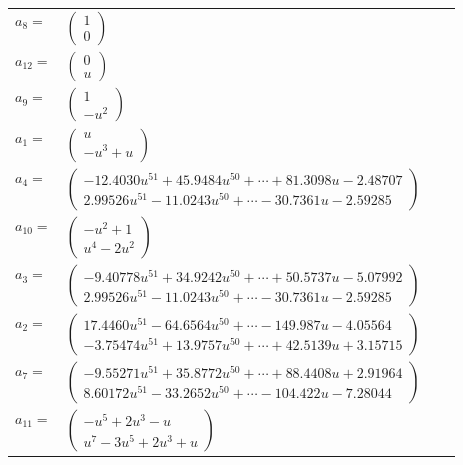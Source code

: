 \documentclass[1p]{elsarticle_modified}
\theoremstyle{definition}
\begin{document}
\begin{tabular}{m{7pt} m{180pt} m{7pt} m{180pt} }
\flushright $a_{8}=$&$\begin{pmatrix}1\\0\end{pmatrix}$ \\
\flushright $a_{12}=$&$\begin{pmatrix}0\\u\end{pmatrix}$ \\
\flushright $a_{9}=$&$\begin{pmatrix}1\\- u^2\end{pmatrix}$ \\
\flushright $a_{1}=$&$\begin{pmatrix}u\\- u^3+u\end{pmatrix}$ \\
\flushright $a_{4}=$&$\begin{pmatrix}-12.4030 u^{51}+45.9484 u^{50}+\cdots+81.3098 u-2.48707\\2.99526 u^{51}-11.0243 u^{50}+\cdots-30.7361 u-2.59285\end{pmatrix}$ \\
\flushright $a_{10}=$&$\begin{pmatrix}- u^2+1\\u^4-2 u^2\end{pmatrix}$ \\
\flushright $a_{3}=$&$\begin{pmatrix}-9.40778 u^{51}+34.9242 u^{50}+\cdots+50.5737 u-5.07992\\2.99526 u^{51}-11.0243 u^{50}+\cdots-30.7361 u-2.59285\end{pmatrix}$ \\
\flushright $a_{2}=$&$\begin{pmatrix}17.4460 u^{51}-64.6564 u^{50}+\cdots-149.987 u-4.05564\\-3.75474 u^{51}+13.9757 u^{50}+\cdots+42.5139 u+3.15715\end{pmatrix}$ \\
\flushright $a_{7}=$&$\begin{pmatrix}-9.55271 u^{51}+35.8772 u^{50}+\cdots+88.4408 u+2.91964\\8.60172 u^{51}-33.2652 u^{50}+\cdots-104.422 u-7.28044\end{pmatrix}$ \\
\flushright $a_{11}=$&$\begin{pmatrix}- u^5+2 u^3- u\\u^7-3 u^5+2 u^3+u\end{pmatrix}$ \\

\end{tabular}
\end{document}
